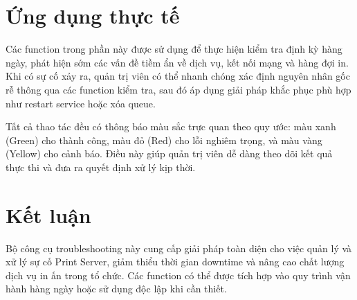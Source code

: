 \section{Ứng dụng thực tế}
Các function trong phần này được sử dụng để thực hiện kiểm tra định kỳ hàng ngày, phát hiện sớm các vấn đề tiềm ẩn về dịch vụ, kết nối mạng và hàng đợi in. Khi có sự cố xảy ra, quản trị viên có thể nhanh chóng xác định nguyên nhân gốc rễ thông qua các function kiểm tra, sau đó áp dụng giải pháp khắc phục phù hợp như restart service hoặc xóa queue.

Tất cả thao tác đều có thông báo màu sắc trực quan theo quy ước: màu xanh (Green) cho thành công, màu đỏ (Red) cho lỗi nghiêm trọng, và màu vàng (Yellow) cho cảnh báo. Điều này giúp quản trị viên dễ dàng theo dõi kết quả thực thi và đưa ra quyết định xử lý kịp thời.

\section{Kết luận}
Bộ công cụ troubleshooting này cung cấp giải pháp toàn diện cho việc quản lý và xử lý sự cố Print Server, giảm thiểu thời gian downtime và nâng cao chất lượng dịch vụ in ấn trong tổ chức. Các function có thể được tích hợp vào quy trình vận hành hàng ngày hoặc sử dụng độc lập khi cần thiết.